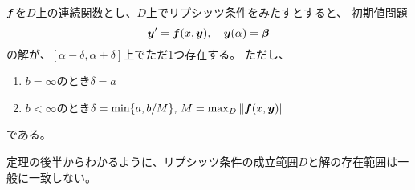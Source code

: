 \documentclass[report]{jlreq}
\begin{document}
\begin{theorem}[1.2.5 解の存在と一意性]
    $\bf$を$D$上の連続関数とし、$D$上でリプシッツ条件をみたすとすると、
    初期値問題
    \begin{equation}
        \by' = \bf(x, \by),\quad \by(\alpha) = \bm{\beta}
        \label{1:eq:1}
    \end{equation}
    の解が、$[\alpha - \delta, \alpha + \delta]$上でただ1つ存在する。
    ただし、
    \begin{enumerate}
        \item $b = \infty$のとき$\delta = a$
        \item $b < \infty$のとき$\delta = \min\{a, b/M\},\, M = \max_{D} \| \bf(x, \bm{y}) \|$
    \end{enumerate}
    である。
\end{theorem}

定理の後半からわかるように、リプシッツ条件の成立範囲$D$と解の存在範囲は一般に一致しない。
\end{document}
